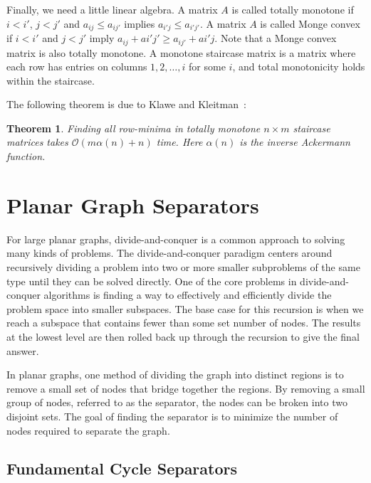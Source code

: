 \documentclass[11pt]{article}
\newtheorem{theorem}{Theorem}[section]
\begin{document}
Finally, we need a little linear algebra. A matrix $A$ is called totally monotone if $i<i'$, $j<j'$ and $a_{ij}\leq a_{ij'}$ implies $a_{i'j}\leq a_{i'j'}$. A matrix $A$ is called Monge convex if $i<i'$ and $j<j'$ imply $a_{ij}+a{i'j'}\geq a_{ij'}+a{i'j}$. Note that a Monge convex matrix is also totally monotone. A monotone staircase matrix is a matrix where each row has entries on columns $1,2,\ldots, i$ for some $i$, and total monotonicity holds within the staircase.

 The following theorem is due to Klawe and Kleitman~\cite{klawe1990almost}:\\

\begin{theorem}
Finding all row-minima in totally monotone $n\times m$ staircase matrices takes $\mathcal{O}(m\alpha(n)+n)$ time. Here $\alpha(n)$ is the inverse Ackermann function.
\end{theorem}

\section{Planar Graph Separators}
\label{sec:graph-sep}


For large planar graphs, divide-and-conquer is a common approach to solving many kinds of problems. The divide-and-conquer paradigm centers around recursively dividing a problem into two or more smaller subproblems of the same type until they can be solved directly. One of the core problems in divide-and-conquer algorithms is finding a way to effectively and efficiently divide the problem space into smaller subspaces. The base case for this recursion is when we reach a subspace that contains fewer than some set number of nodes. The results at the lowest level are then rolled back up through the recursion to give the final answer.

In planar graphs, one method of dividing the graph into distinct regions is to remove a small set of nodes that bridge together the regions. By removing a small group of nodes, referred to as the separator, the nodes can be broken into two disjoint sets. The goal of finding the separator is to minimize the number of nodes required to separate the graph.

\subsection{Fundamental Cycle Separators}
\label{sec:graph-sep-fund-cycle-sep}
\end{document}
